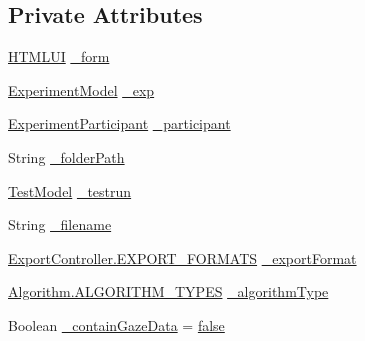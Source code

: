 \subsection*{Private Attributes}
\begin{DoxyCompactItemize}
\item 
\hyperlink{class_web_analyzer_1_1_u_i_1_1_h_t_m_l_u_i}{H\+T\+M\+L\+U\+I} \hyperlink{class_web_analyzer_1_1_u_i_1_1_interaction_objects_1_1_analysis_export_control_ac37986028e8f14ebe20b3e70cc2bafe5}{\+\_\+form}
\item 
\hyperlink{class_web_analyzer_1_1_models_1_1_base_1_1_experiment_model}{Experiment\+Model} \hyperlink{class_web_analyzer_1_1_u_i_1_1_interaction_objects_1_1_analysis_export_control_a7e42e87000b58fb02e37f994efc61259}{\+\_\+exp}
\item 
\hyperlink{class_web_analyzer_1_1_models_1_1_base_1_1_experiment_participant}{Experiment\+Participant} \hyperlink{class_web_analyzer_1_1_u_i_1_1_interaction_objects_1_1_analysis_export_control_ace272af8988b6cfc198db79bb6c2cd13}{\+\_\+participant}
\item 
String \hyperlink{class_web_analyzer_1_1_u_i_1_1_interaction_objects_1_1_analysis_export_control_a52ae3dbae930a01e4ddb368fdd820ac7}{\+\_\+folder\+Path}
\item 
\hyperlink{class_web_analyzer_1_1_models_1_1_data_model_1_1_test_model}{Test\+Model} \hyperlink{class_web_analyzer_1_1_u_i_1_1_interaction_objects_1_1_analysis_export_control_adb1ac5a4139c8bee5b1c694983154936}{\+\_\+testrun}
\item 
String \hyperlink{class_web_analyzer_1_1_u_i_1_1_interaction_objects_1_1_analysis_export_control_a281522ffdb5738b1c5f7609bc61e6358}{\+\_\+filename}
\item 
\hyperlink{class_web_analyzer_1_1_controller_1_1_export_controller_a8cea4a311ecaf495f305f9d7829a57aa}{Export\+Controller.\+E\+X\+P\+O\+R\+T\+\_\+\+F\+O\+R\+M\+A\+T\+S} \hyperlink{class_web_analyzer_1_1_u_i_1_1_interaction_objects_1_1_analysis_export_control_a941e74e9bf284b29110295a481b31697}{\+\_\+export\+Format}
\item 
\hyperlink{class_web_analyzer_1_1_models_1_1_algorithm_model_1_1_algorithm_a170e7786e033cbd0c09cabb30030794b}{Algorithm.\+A\+L\+G\+O\+R\+I\+T\+H\+M\+\_\+\+T\+Y\+P\+E\+S} \hyperlink{class_web_analyzer_1_1_u_i_1_1_interaction_objects_1_1_analysis_export_control_a92c996b73e5cde9c50d25355e47fb423}{\+\_\+algorithm\+Type}
\item 
Boolean \hyperlink{class_web_analyzer_1_1_u_i_1_1_interaction_objects_1_1_analysis_export_control_aa58521f4baa630aee5ccf3034f74b543}{\+\_\+contain\+Gaze\+Data} = \hyperlink{_u_i_2_h_t_m_l_resources_2js_2src_2export_8js_ae6c865df784842196d411c1466b01686}{false}
\end{DoxyCompactItemize}


